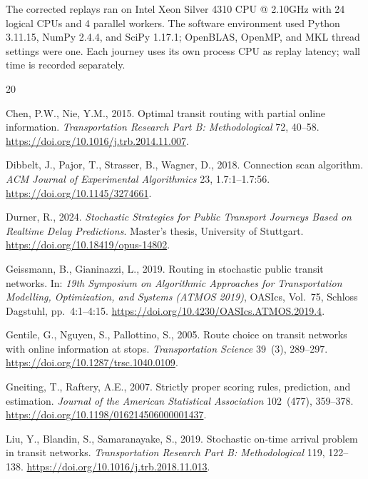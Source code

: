 \documentclass[preprint,12pt,authoryear]{elsarticle}
\begin{document}
The corrected replays ran on Intel Xeon Silver 4310 CPU @ 2.10GHz with 24 logical CPUs and 4 parallel workers. The software environment used Python 3.11.15, NumPy 2.4.4, and SciPy 1.17.1; OpenBLAS, OpenMP, and MKL thread settings were one. Each journey uses its own process CPU as replay latency; wall time is recorded separately.

\begin{thebibliography}{20}

Chen, P.W., Nie, Y.M., 2015. Optimal transit routing with partial online
information. \emph{Transportation Research Part B: Methodological} 72, 40--58.
\url{https://doi.org/10.1016/j.trb.2014.11.007}.

Dibbelt, J., Pajor, T., Strasser, B., Wagner, D., 2018. Connection scan
algorithm. \emph{ACM Journal of Experimental Algorithmics} 23, 1.7:1--1.7:56.
\url{https://doi.org/10.1145/3274661}.

Durner, R., 2024. \emph{Stochastic Strategies for Public Transport Journeys
Based on Realtime Delay Predictions}. Master's thesis, University of Stuttgart.
\url{https://doi.org/10.18419/opus-14802}.

Geissmann, B., Gianinazzi, L., 2019. Routing in stochastic public transit
networks. In: \emph{19th Symposium on Algorithmic Approaches for Transportation
Modelling, Optimization, and Systems (ATMOS 2019)}, OASIcs, Vol.~75, Schloss
Dagstuhl, pp.~4:1--4:15. \url{https://doi.org/10.4230/OASIcs.ATMOS.2019.4}.

Gentile, G., Nguyen, S., Pallottino, S., 2005. Route choice on transit networks
with online information at stops. \emph{Transportation Science} 39~(3),
289--297. \url{https://doi.org/10.1287/trsc.1040.0109}.

Gneiting, T., Raftery, A.E., 2007. Strictly proper scoring rules, prediction,
and estimation. \emph{Journal of the American Statistical Association}
102~(477), 359--378. \url{https://doi.org/10.1198/016214506000001437}.

Liu, Y., Blandin, S., Samaranayake, S., 2019. Stochastic on-time arrival problem
in transit networks. \emph{Transportation Research Part B: Methodological}
119, 122--138. \url{https://doi.org/10.1016/j.trb.2018.11.013}.


\end{thebibliography}
\end{document}
